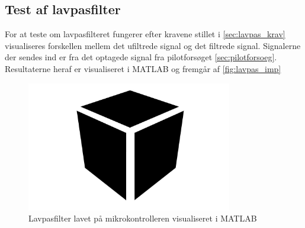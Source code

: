 \subsection{Test af lavpasfilter}
For at teste om lavpasfilteret fungerer efter kravene stillet i \autoref{sec:lavpas_krav} visualiseres forskellen mellem det ufiltrede signal og det filtrede signal. Signalerne der sendes ind er fra det optagede signal fra pilotforsøget \autoref{sec:pilotforsoeg}. Resultaterne heraf er visualiseret i MATLAB og fremgår af \autoref{fig:lavpas_imp}

\begin{figure}[H]
\centering
\includegraphics[width=0.8\textwidth]{figures/Pilotforsoeg/blackbox}
\caption{Lavpasfilter lavet på mikrokontrolleren visualiseret i MATLAB}
\label{fig:lavpas_imp}
\end{figure}
 